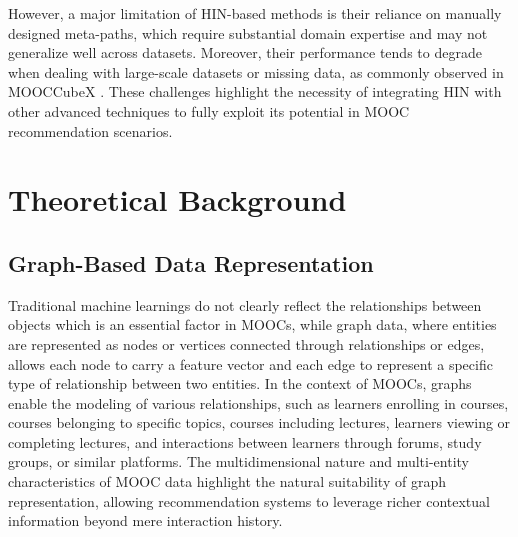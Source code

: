 \documentclass{ieeeaccess}
\begin{document}
However, a major limitation of HIN-based methods is their reliance on manually designed meta-paths, which require substantial domain expertise and may not generalize well across datasets. Moreover, their performance tends to degrade when dealing with large-scale datasets or missing data, as commonly observed in MOOCCubeX \cite{yu2021mooccubex}. These challenges highlight the necessity of integrating HIN with other advanced techniques to fully exploit its potential in MOOC recommendation scenarios.

\section{Theoretical Background}
\label{sec:background}

\subsection{Graph-Based Data Representation}

Traditional machine learnings  do not clearly reflect the relationships between objects which is an essential factor in MOOCs, while graph data, where entities are represented as nodes or vertices connected through relationships or edges, allows each node to carry a feature vector and each edge to represent a specific type of relationship between two entities. In the context of MOOCs, graphs enable the modeling of various relationships, such as learners enrolling in courses, courses belonging to specific topics, courses including lectures, learners viewing or completing lectures, and interactions between learners through forums, study groups, or similar platforms. The multidimensional nature and multi-entity characteristics of MOOC data highlight the natural suitability of graph representation, allowing recommendation systems to leverage richer contextual information beyond mere interaction history.
\end{document}
